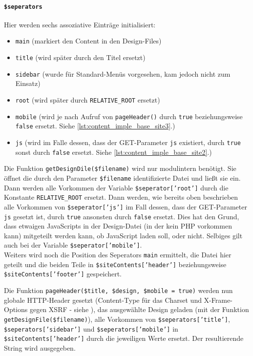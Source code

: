 \paragraph{\texttt{\$seperators}\\}
Hier werden sechs assoziative Einträge initialisiert:
\begin{itemize}
	\item \texttt{main} (markiert den Content in den Design-Files)
	\item \texttt{title} (wird später durch den Titel ersetzt)
	\item \texttt{sidebar} (wurde für Standard-Menüs vorgesehen, kam jedoch nicht zum Einsatz)
	\item \texttt{root} (wird später durch \texttt{RELATIVE\_ROOT} ersetzt)
	\item \texttt{mobile} (wird je nach Aufruf von \texttt{pageHeader()} durch \texttt{true} beziehungsweise \texttt{false} ersetzt. Siehe \autoref{lst:content_imple_base_site3}.)
	\item \texttt{js} (wird im Falle dessen, dass der GET-Parameter \texttt{js} existiert, durch \texttt{true} sonst durch \texttt{false} ersetzt. Siehe \autoref{lst:content_imple_base_site2}.)
\end{itemize}


Die Funktion \texttt{getDesignDile(\$filename)} wird nur modulintern benötigt. Sie öffnet die durch den Parameter \texttt{\$filename} identifizierte Datei und ließt sie ein. Dann werden alle Vorkommen der Variable \texttt{\$seperator['root']} durch die Konstante \texttt{RELATIVE\_ROOT} ersetzt. Dann werden, wie bereits oben beschrieben alle Vorkommen von \texttt{\$seperator['js']} im Fall dessen, dass der GET-Parameter \texttt{js} gesetzt ist, durch \texttt{true} ansonsten durch \texttt{false} ersetzt. Dies hat den Grund, dass etwaigen JavaScripts in der Design-Datei (in der kein PHP vorkommen kann) mitgeteilt werden kann, ob JavaScript laden soll, oder nicht. Selbiges gilt auch bei der Variable \texttt{\$seperator['mobile']}.\\
Weiters wird noch die Position des Seperators \texttt{main} ermittelt, die Datei hier geteilt und die beiden Teile in \texttt{\$siteContents['header']} beziehungsweise \texttt{\$siteContents['footer']} gespeichert.


Die Funktion \texttt{pageHeader(\$title, \$design, \$mobile = true)} werden nun globale HTTP-Header gesetzt (Content-Type für das Charset und X-Frame-Options gegen XSRF - siehe ), das ausgewählte Design geladen (mit der Funktion \texttt{getDesignFile(\$filename)}), alle Vorkommen von \texttt{\$seperators['title']}, \texttt{\$seperators['sidebar']} und \texttt{\$seperators['mobile']} in \texttt{\$siteContents['header']} durch die jeweiligen Werte ersetzt. Der resultierende String wird ausgegeben. 

